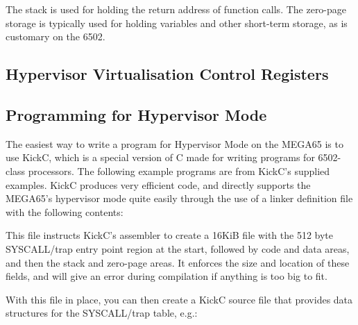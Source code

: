 The stack is used for holding the return address of function calls.  The zero-page storage is typically used for holding
variables and other short-term storage, as is customary on the 6502.

\subsection{Hypervisor Virtualisation Control Registers}



\subsection{Programming for Hypervisor Mode}

The easiest way to write a program for Hypervisor Mode on the MEGA65 is to use KickC, which is a special version of C
made for writing programs for 6502-class processors.  The following example programs are from KickC's supplied examples.
KickC produces very efficient code, and directly supports the MEGA65's
hypervisor mode quite easily through the use of a linker definition file with the following contents:


This file instructs KickC's assembler to create a 16KiB file with the 512 byte SYSCALL/trap entry point region at the start,
followed by code and data areas, and then the stack and zero-page areas. It enforces the size and location of these fields, and
will give an error during compilation if anything is too big to fit.

With this file in place, you can then create a KickC source file that provides data structures for the SYSCALL/trap table, e.g.:

